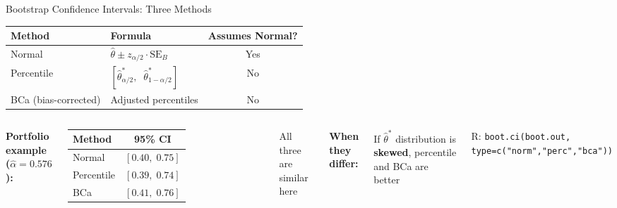 \documentclass[aspectratio=169, 11pt]{beamer}
\begin{document}
\begin{frame}{Bootstrap Confidence Intervals: Three Methods}

\begin{center}
\begin{tabular}{llc}
\toprule
Method & Formula & Assumes Normal? \\
\midrule
Normal & $\hat{\theta} \pm z_{\alpha/2} \cdot \text{SE}_B$ & Yes \\
Percentile & $[\hat{\theta}^*_{\alpha/2}, \;\; \hat{\theta}^*_{1-\alpha/2}]$ & No \\
BCa (bias-corrected) & Adjusted percentiles & No \\
\bottomrule
\end{tabular}
\end{center}

\vspace{0.5em}
\begin{columns}
\textbf{Portfolio example ($\hat{\alpha} = 0.576$):}

\begin{tabular}{lc}
\toprule
Method & 95\% CI \\
\midrule
Normal & $[0.40, \; 0.75]$ \\
Percentile & $[0.39, \; 0.74]$ \\
BCa & $[0.41, \; 0.76]$ \\
\bottomrule
\end{tabular}

All three are similar here

\textbf{When they differ:}

If $\hat{\theta}^*$ distribution is \textbf{skewed}, percentile and BCa are better

\vspace{0.3em}
\footnotesize R: \texttt{boot.ci(boot.out,}\\
\texttt{\quad type=c("norm","perc","bca"))}
\end{columns}
\end{frame}
\end{document}
